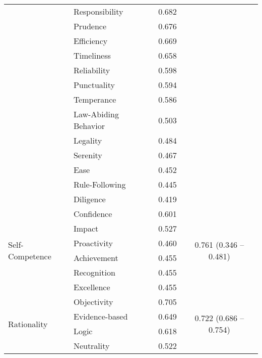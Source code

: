 \begin{longtable}{llcc}
                                &  Responsibility  & 0.682 & \\
                                &  Prudence  & 0.676 & \\
                                &  Efficiency  & 0.669 & \\
                                &  Timeliness  & 0.658 & \\
                                &  Reliability  & 0.598 & \\
                                &  Punctuality & 0.594 & \\
                                &  Temperance & 0.586 & \\
                                &  Law-Abiding Behavior & 0.503 & \\
                                &  Legality & 0.484 & \\
                                &  Serenity & 0.467 & \\
                                &  Ease & 0.452 & \\
                                &  Rule-Following & 0.445 & \\
                                &  Diligence & 0.419 & \\
        \midrule
        \multirow{6}{*}{Self-Competence}
                                    & Confidence   & 0.601 & \multirow{6}{*}{0.761 (0.346 -- 0.481)} \\
                                    & Impact       & 0.527 & \\
                                    & Proactivity  & 0.460 & \\
                                    & Achievement  & 0.455 & \\
                                    & Recognition  & 0.455 & \\
                                    & Excellence   & 0.455 & \\
        \midrule
        \multirow{4}{*}{Rationality}
                                    & Objectivity & 0.705 & \multirow{4}{*}{0.722 (0.686 -- 0.754)} \\
                                    & Evidence-based & 0.649 & \\
                                    & Logic & 0.618 & \\
                                    & Neutrality & 0.522 & \\
        \bottomrule
\end{longtable}

